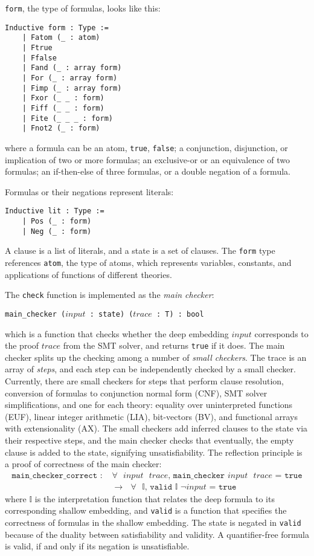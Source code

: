 \documentclass{article}
\begin{document}
	\texttt{form}, the type of 
	formulas, looks like this:
	\begin{verbatim}
Inductive form : Type :=
	| Fatom (_ : atom)
	| Ftrue
	| Ffalse
	| Fand (_ : array form)
	| For (_ : array form)
	| Fimp (_ : array form)
	| Fxor (_ _ : form)
	| Fiff (_ _ : form)
	| Fite (_ _ _ : form)
	| Fnot2 (_ : form)
	\end{verbatim}
	where a formula can be an atom, 
	\texttt{true}, \texttt{false};
	a conjunction, disjunction, or 
	implication of two or more 
	formulas; an exclusive-or or
	an equivalence of two formulas; 
	an if-then-else of three formulas, 
	or a double negation of a formula.
	
	Formulas or their negations 
	represent literals:
	\begin{verbatim}
Inductive lit : Type :=
	| Pos (_ : form)
	| Neg (_ : form)
	\end{verbatim}
	A clause is a list of literals,
	and a state is a set of clauses.
	The \texttt{form} type references 
	\texttt{atom}, the type of atoms, 
	which represents variables, 
	constants, and applications of 
	functions of different theories.
	
	\noindent The \texttt{check} 
	function is implemented as the 
	\textit{main checker}: 
	\begin{center}
		\texttt{main\_checker ($input$ : 
			state) ($trace$ : T) : bool}	
	\end{center}
	which is a function that checks 
	whether the deep embedding $input$
	corresponds to the proof 
	$trace$ from the SMT solver, 
	and returns \texttt{true} if it 
	does. The main checker splits up 
	the checking among a number of 
	\textit{small checkers}. The 
	trace is an array of \textit{steps}, 
	and each step can be independently 
	checked by a small checker. Currently, 
	there are small checkers for steps 
	that perform clause resolution, 
	conversion of formulas to conjunction 
	normal form (CNF), SMT solver 
	simplifications, and one for each 
	theory:	equality over uninterpreted 
	functions (EUF), linear integer 
	arithmetic (LIA), bit-vectors (BV), 
	and functional arrays with 
	extensionality (AX). The small
	checkers add inferred clauses to 
	the state via their respective 
	steps, and the main checker 
	checks that eventually, the empty 
	clause is added to the state, 
	signifying unsatisfiability. The 
	reflection principle is a proof of 
	correctness of the main checker:
	\begin{align*}
		\texttt{main\_checker\_correct
		: } &\texttt{$\forall$ $input$ 
		$trace$, main\_checker $input$ 
		$trace$ = true}\\
		&\texttt{$\to$ $\forall$ 
		$\mathbb{I}$,
		valid $\mathbb{I}$
		$\neg input$ = true}
	\end{align*}
	where $\mathbb{I}$ is the 
	interpretation function that 
	relates the deep formula to its 
	corresponding shallow embedding,
	and \texttt{valid} is a function 
	that specifies the correctness
	of formulas in the shallow 
	embedding. The state is 
	negated in \texttt{valid} because 
	of the duality between 
	satisfiability and validity. A
	quantifier-free formula is valid, 
	if and only if its negation 
	is unsatisfiable. 
	
\end{document}
